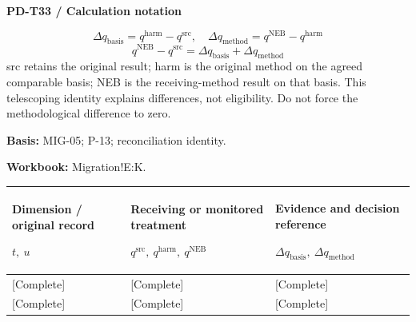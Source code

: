 \Needspace{112mm}
\par\begingroup\sffamily\fontsize{8}{10}\selectfont\color{NEBGreen}\setlength{\parskip}{2pt}\setlength{\abovedisplayskip}{4pt}\setlength{\belowdisplayskip}{4pt}\setlength{\abovedisplayshortskip}{2pt}\setlength{\belowdisplayshortskip}{3pt}
\textbf{PD-T33 / Calculation notation}\par
{\fontsize{9}{11}\selectfont\[ \Delta q_{\mathrm{basis}}=q^{\mathrm{harm}}-q^{\mathrm{src}},\quad \Delta q_{\mathrm{method}}=q^{\mathrm{NEB}}-q^{\mathrm{harm}} \]}
{\fontsize{9}{11}\selectfont\[ q^{\mathrm{NEB}}-q^{\mathrm{src}}=\Delta q_{\mathrm{basis}}+\Delta q_{\mathrm{method}} \]}
src retains the original result; harm is the original method on the agreed comparable basis; NEB is the receiving-method result on that basis. This telescoping identity explains differences, not eligibility. Do not force the methodological difference to zero.\par
\textbf{Basis:} MIG-05; P-13; reconciliation identity.\par
\textbf{Workbook:} Migration!E:K.\par\endgroup
{\sffamily\fontsize{8.3}{10.3}\selectfont\begin{longtable}{@{}P{54.83mm} P{54.83mm} P{54.83mm}@{}}
\toprule
\textbf{Dimension / original record}\par {\normalfont\fontsize{8.2}{10}\selectfont $t,\ u$} & \textbf{Receiving or monitored treatment}\par {\normalfont\fontsize{8.2}{10}\selectfont $q^{\mathrm{src}},\ q^{\mathrm{harm}},\ q^{\mathrm{NEB}}$} & \textbf{Evidence and decision reference}\par {\normalfont\fontsize{8.2}{10}\selectfont $\Delta q_{\mathrm{basis}},\ \Delta q_{\mathrm{method}}$}\\\midrule\endhead
\rule{0pt}{8mm}[Complete] & [Complete] & [Complete]\\\hline
\rule{0pt}{8mm}[Complete] & [Complete] & [Complete]\\\hline
\end{longtable}}

